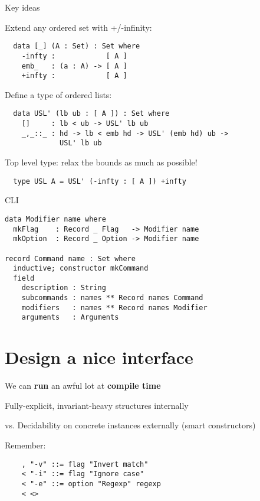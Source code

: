 \documentclass[dvipsnames]{beamer}
\begin{document}
\begin{frame}[fragile]{Key ideas}

  Extend any ordered set with +/-infinity:
  \begin{verbatim}
  data [_] (A : Set) : Set where
    -infty :            [ A ]
    emb_   : (a : A) -> [ A ]
    +infty :            [ A ]
  \end{verbatim}

  Define a type of ordered lists:
  \begin{verbatim}
  data USL' (lb ub : [ A ]) : Set where
    []     : lb < ub -> USL' lb ub
    _,_::_ : hd -> lb < emb hd -> USL' (emb hd) ub ->
             USL' lb ub
  \end{verbatim}

  Top level type: relax the bounds as much as possible!
  \begin{verbatim}
  type USL A = USL' (-infty : [ A ]) +infty
  \end{verbatim}
\end{frame}

\begin{frame}[fragile]{CLI}

\begin{verbatim}
data Modifier name where
  mkFlag    : Record _ Flag   -> Modifier name
  mkOption  : Record _ Option -> Modifier name

record Command name : Set where
  inductive; constructor mkCommand
  field
    description : String
    subcommands : names ** Record names Command
    modifiers   : names ** Record names Modifier
    arguments   : Arguments
\end{verbatim}
\end{frame}

\section{Design a nice interface}
\begin{frame}[fragile]{We can \textbf{run} an awful lot at \textbf{compile time}}

  Fully-explicit, invariant-heavy structures internally

  vs. Decidability on concrete instances externally (smart constructors)

  Remember:
  \begin{verbatim}
    , "-v" ::= flag "Invert match"
    < "-i" ::= flag "Ignore case"
    < "-e" ::= option "Regexp" regexp
    < <>
  \end{verbatim}
\end{frame}
\end{document}
